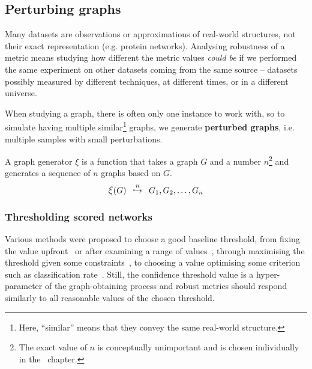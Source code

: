 

\subsection{Perturbing graphs}\label{sec:perturbing_graphs}

Many datasets are observations or approximations of real-world structures, not their exact representation (e.g. protein networks).
Analysing robustness of a metric means studying how different the metric values \textsl{could be} if we performed the same experiment on other datasets coming from the same source -- datasets possibly measured by different techniques, at different times, or in a different universe.

When studying a graph, there is often only one instance to work with, so to simulate having multiple similar\footnote{Here, ``similar'' means that they convey the same real-world structure.} graphs, we generate \textbf{perturbed graphs}, i.e. multiple samples with small perturbations.

\begin{savenotes}
    \begin{definition}
        \vspace*{-2mm}
        A graph generator $\xi$ is a function that takes a graph $G$ and a number $n$\footnote{The exact value of $n$ is conceptually unimportant and is chosen individually in the~ chapter.} and generates a sequence of $n$ graphs based on $G$.
        \begin{equation}
            \mathlarger{\xi}(G) \generates{n} G_1, G_2, \dots, G_n
        \end{equation}
    \end{definition}
\end{savenotes}

\subsubsection*{Thresholding scored networks}

Various methods were proposed to choose a good baseline threshold, from fixing the value upfront~\cite{MeunierAgerelatedChangesModular2009} or after examining a range of values~\cite{vanWijkComparingBrainNetworks2010,HorstmannStateDependentProperties2010}, through maximising the threshold given some constraints~\cite{BassettAdaptiveReconfigurationFractal2006}, to choosing a value optimising some criterion such as classification rate~\cite{ZaninOptimizingFunctionalNetwork2012}.
Still, the confidence threshold value is a hyper-parameter of the graph-obtaining process and robust metrics should respond similarly to all reasonable values of the chosen threshold.

